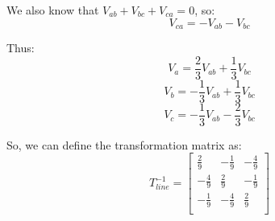 We also know that \( V_{ab} + V_{bc} + V_{ca} = 0 \), so:
\[
    V_{ca} = -V_{ab} - V_{bc}
\]

Thus:
\[
    V_a = \frac{2}{3}V_{ab} + \frac{1}{3}V_{bc}
\]
\[
    V_b = -\frac{1}{3}V_{ab} + \frac{1}{3}V_{bc}
\]
\[
    V_c = -\frac{1}{3}V_{ab} - \frac{2}{3}V_{bc}
\]

So, we can define the transformation matrix as:
\[
    T_{line}^{-1} = \begin{bmatrix}
        \frac{2}{9}  & -\frac{1}{9} & -\frac{4}{9} \\
        -\frac{4}{9} & \frac{2}{9}  & -\frac{1}{9} \\
        -\frac{1}{9} & -\frac{4}{9} & \frac{2}{9}  \\
    \end{bmatrix}
\]
